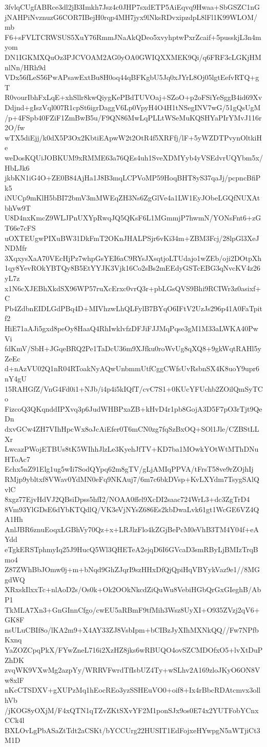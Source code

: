 3fvlqCUgfABRce3dl2jB3Imkh7Jsz4c0JHP7sxdETP5AiEqvq9Hwaa+SbGSZC1nG
jNAHPiNvznuzG6COR7IBejH0rqp4MH7jyx9lNksRDvxipzdpL8lFl1K99WLOM/mb
F6+sFVLTCRWSUS5XuY76RmmJNaAkQDeo5xvyhptwPxrZcaif+5pusskjL3n4myom
DN1IGKMXQuOz3PJCVOAM2AG0yOA0GWIQXXMEK9Qi/q6FRF3cLGKjHMnlNn/HRh9d
VDx56fLeS56PwAPsawExtBu8H0oq44qBFKgbU5Jq0xJYrL8Oj05lgtEefvRTQ+gT
R0vourIbhFxLqE+xhSllr8kwQiygKePBdTUVOaj+SZoO+p2oFSiYeSggB4id69Xv
Ddjnd+gIszVql007R1cpSt6igrDaggV6Lp0VpyH4O4H1tNSegINV7wG/51gQsUgM
/p+4FSpb40FZiF1ZmBwB5u/F9QN86MwLqPLLtWSeMuKQSHYaPIrYMvJ116r2O/fw
wTX5diEjj/k0dX5P3Ox2KbtiEApwW2t2OtR4f5XRFfj/lF+5yWZDTPvynOltkiHe
weDosKQUiJOBKUM9xRMME63a76QEs4uh1SveXDMYyb4yVSEdvrUQYbm5x/HbLJk6
jkbKN1iG4O+ZE0B84AjHa1J8B3mqLCPVoMP59HoqBHT8yS37qaJj/pcpncBfiPk5
iNUCp9mKlH5bBI72bmV3mMWEqZH3Ns6ZgGlVe4a1LW1EyJObeLGQfNUXAtbhVw9T
U8D4nxKmcZ9WLJPnUXYpRwqJQ5QKsF6L1MGmmjP7hwmN/YONsFnt6+zGT66e7cFS
uOXTEUgwPIXuBW31DkFmT2OKnJHALPSjr6vKi34m+ZBM3Fcj/28lpGl3XeJNDMfr
3XqxysXaA70VEcHjPz7whpGsYEI6aC9RYsJXsqtjoLTUdajo1wZEb/oji2DOtpXh
1qy8YevROkYBTQy8B5EtYYJK3Vjk16Co2sBs2mEEdyGSTcEBG3qNvcKV4z26yL7z
x1N6cXJEBhXkdSX96WP57ruXcErxc0vrQ3r+pbLGsQVS9Bhi9RCIWr3z0asixf+C
Pb4ZdbnEIDLGdPBq4D+MIVhzwLhQLFylB7BYqO6IFtV2UzJs296p41A0FaTpitf2
HiE71aAJi5gxd8peOy8HaaQ4RhIwklvfzDFJiFJJMqPqse3gM1M33aLWKA40PwVi
fdKmV/SbH+JGqeBRQ2Pe1TaDcU36m9XJfku0roWvUg8qXQ8+9gkWqtRAHl5yZeEc
d+nAzVU02Q1nR04RToakNyAQwUnbmmUtfCggCWfsUvRsbnSX4K8uoY9upr6nY4gU
15RAHGfZ/VnG4Fd0i1+NJb/i4p4i5kIQfT/cvC7S1+0KUcYFUchb2ZOilQmSyTCo
FizcoQ3QKqnddIPXvq3p6JudWHBPxaZB+kHvD4r1pb8GojA3D5F7pO3rTjt9QeDn
dxvGCw4ZH7VIhHpcWx8oJcAiEfer0T6mCN0zg7fqSzBxOQ+SOl1Jle/CZBStLLXr
LwcazPWojETBUs8tK5WIhhJlzLe3KyehJfTV+KD7ba1MOwkYOtWtMThDNuHToAc7
Echx5nZ91Elg1ug5wIi7SodQYpq62m8gTV/gLjAMIqPPVA/tFrsT58ve9rZOjhIj
RMjp9ybltxf8VWav0YdMN0eFq9NKAuj7/6m7c6bkDVsp+KvLXYdm7TsygSAlQvlC
8xgz77EjvHdVJ2QBsiDpss5hfI2/NOAA0ffel9XcDI2saac724WrL3+dc3ZgTrD4
8Vm93YlGDsE6dYbKTQdlQ/VK3eVjNYsZ686Es2kbDwaLvk61gt1WcGE6VZ4QA1Hh
AnlJBR6znuEoqxLGBhVy70Qz+x+LRJlzFlo4kZGjBePcM0eVhB3TM4Y04f+eAYdd
eTgkERSTphmyIq25J9HucQ5Wl3QHETeA2ejqD6I6GVcaD3smRByLjBMIzTrqBmo4
Z87ZWhBbJOmw0j+m+bNqd9GhZJqrI9szHHxDfQjQpiHqVBYykVaz9e1//8MGgdWQ
XRxskIlxxTc+nlAoD2s/Os0k+Ok2OOkNkcdZiQuWu8VebiHGbQrGxGIeghB/AbP1
TkMLA7Xn3+GnGInnCfgo/cwEU5aRBmF9tfMih3Wsz8UyXI+O935ZVzj2qV6+GK8F
nsULuCBIf8o/lKA2m9+X4AY33ZJ8VsbIpm+bCIBzJyXIhMXNkQQ//Fw7NPfbKxnq
YaZOZCpqPkX/FYwZneL716i2XzHZ8jks6wRBUQO4ovSZCMDOfxO5+lvXtDuPZhDK
zvqWK9VXwMg2azpYy/WRRVFwrdTfIsbUZ4Ty+wSLhv2A169zloJKyO6ON8Vw8xlF
nKcCTSDXV+gXUPzMq1hEocREo3yzSSHEuVO0+oif8+Ix4rBbcRDAtcmvx3ollhVb
/jKOG8yOXjM/F4xQTN1qTZvZKtSXvYF2M1ponSJx9os0E74x2YUTFobYCnxCCk4l
BXLOvLgPbASaZtTdt2aCSKt/bYCCUrg22HUSIT1EdFojxeHYwpgN5aWTjiCt3M1D
